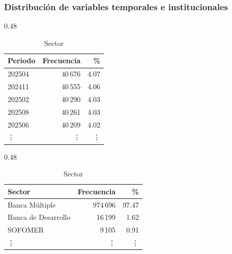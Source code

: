 \subsubsection{Distribución de variables temporales e institucionales}
\begin{table}[H]
	\centering
	
	\begin{subtable}[t]{0.48\textwidth}
		\centering
		\caption{Periodo}
		\begin{tabular}{lrr}
			\toprule
			\textbf{Periodo} & \textbf{Frecuencia} & \textbf{\%} \\
			\midrule
			202504 & 40\,676 & 4.07 \\
			202411 & 40\,555 & 4.06 \\
			202502 & 40\,290 & 4.03 \\
			202508 & 40\,261 & 4.03 \\
			202506 & 40\,209 & 4.02 \\
			\vdots & \vdots & \vdots \\
			\bottomrule
		\end{tabular}
	\end{subtable}
	\hfill
	\begin{subtable}[t]{0.48\textwidth}
		\centering
		\caption{Sector}
		\begin{tabular}{lrr}
			\toprule
			\textbf{Sector} & \textbf{Frecuencia} & \textbf{\%} \\
			\midrule
			Banca Múltiple & 974\,696 & 97.47 \\
			Banca de Desarrollo & 16\,199 & 1.62 \\
			SOFOMER & 9\,105 & 0.91 \\
			\vdots & \vdots & \vdots \\
			\bottomrule
		\end{tabular}
	\end{subtable}
	
	\vspace{0.5cm}
	

\end{table}
